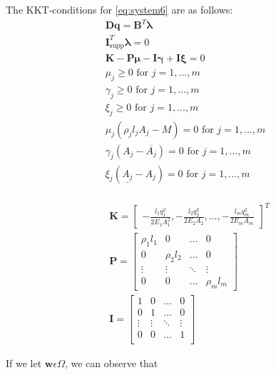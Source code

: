 

The KKT-conditions for \eqref{eq:system6} are as follows:
\begin{equation}
\label{KKT_system6}
\begin{aligned}
\bm{Dq} = \bm{B}^{T}\bm{\lambda}\\
\bm{I}^{T}_{\textrm{supp}}\bm{\lambda} = 0 \\
\bm{K} - \bm{P}\bm{\mu} - \bm{I}\bm{\gamma} + \bm{I}\bm{\xi} = 0 \\
\mu_j \geq 0  \text{ for } j = 1,...,m \\
\gamma_j \geq 0 \text{ for } j = 1,...,m \\
\xi_j \geq 0 \text{ for } j = 1,...,m \\
\mu_j(\rho_{j}l_{j}A_{j}-M) = 0 \text{ for } j = 1,...,m \\
\gamma_{j}(A_{j}-\overline{A_{j}}) = 0 \text{ for } j = 1,...,m \\
\xi_{j}(\underline{A_{j}}-A_{j}) = 0 \text{ for } j = 1,...,m \\
\end{aligned}
\end{equation}

\begin{align*}
&\bm{K} = \begin{bmatrix}
       -\frac{l_{1}q_{1}^2}{2E_{1}A_{1}^2}
       , -\frac{l_{2}q_{2}^2}{2E_{2}A_{2}}, \hdots,-\frac{l_{m}q_{m}^2}{2E_{m}A_{m}}
     \end{bmatrix}^T \\
&\bm{P} = \begin{bmatrix}
\rho_{1}l_{1} &  0  & \ldots & 0\\
0  &  \rho_{2}l_{2} & \ldots & 0\\
\vdots & \vdots & \ddots & \vdots\\
0  &   0       &\ldots & \rho_{m}l_{m}
\end{bmatrix}\\
&\bm{I} = \begin{bmatrix}
1 &  0  & \ldots & 0\\
0  &  1 & \ldots & 0\\
\vdots & \vdots & \ddots & \vdots\\
0  &   0  &\ldots & 1 \\
\end{bmatrix}
\end{align*}

If we let $\bm{w}  \epsilon  \Omega$, we can observe that

